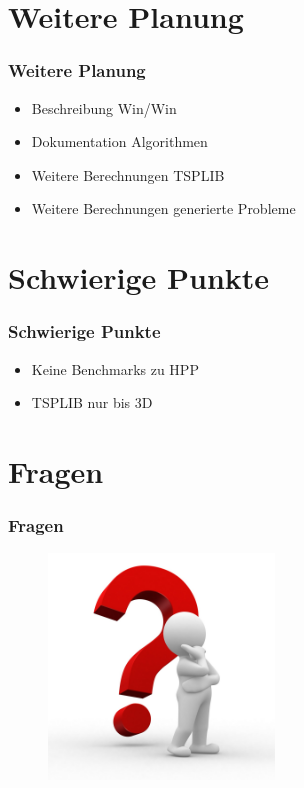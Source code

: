 \documentclass[12pt]{beamer}
\begin{document}
    \section{Weitere Planung}
    \begin{frame}
        \frametitle{Weitere Planung}
	    \begin{itemize}
                \item Beschreibung Win/Win
                \item Dokumentation Algorithmen
                \item Weitere Berechnungen TSPLIB
                \item Weitere Berechnungen generierte Probleme
            \end{itemize}
    \end{frame}

    \section{Schwierige Punkte}
    \begin{frame}
        \frametitle{Schwierige Punkte}
	    \begin{itemize}
                \item Keine Benchmarks zu HPP
                \item TSPLIB nur bis 3D
            \end{itemize}
    \end{frame}

    \section{Fragen}
    \begin{frame}
    \frametitle{Fragen}
        \begin{figure}[H]
	    \centering
	        \includegraphics[width=6cm]{gfx/questionmark}
        \end{figure}
    \end{frame}
\end{document}
